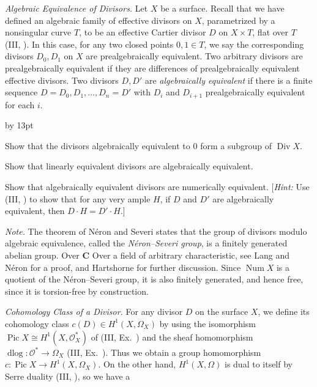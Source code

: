 {{\vspace{2pt}
\noindent\hypertarget{ex-V-1.7}{}\emph{Algebraic Equivalence of Divisors.} Let $X$ be a surface. Recall that we have defined an algebraic family of effective divisors on $X$, parametrized by a nonsingular curve $T$, to be an effective Cartier divisor $D$ on $X\times T$, flat over $T$ (III, ). In this case, for any two closed points $0,1\in T$, we say the corresponding divisors $D_0,D_1$ on $X$ are prealgebraically equivalent. Two arbitrary divisors are prealgebraically equivalent if they are differences of prealgebraically equivalent effective divisors. Two divisors $D,D'$ are \emph{algebraically equivalent} if there is a finite sequence $D=D_0,D_1,\ldots,D_n=D'$ with $D_i$ and $D_{i+1}$ prealgebraically equivalent for each $i$.
{\advance\leftskip by 13pt\par
\noindent\hypertarget{ex-V-1.7a}{}Show that the divisors algebraically equivalent to $0$ form a subgroup of $\operatorname{Div}X$.

\noindent\hypertarget{ex-V-1.7b}{}Show that linearly equivalent divisors are algebraically equivalent.

\noindent\hypertarget{ex-V-1.7c}{}Show that algebraically equivalent divisors are numerically equivalent. [\emph{Hint:} Use (III, ) to show that for any very ample $H$, if $D$ and $D'$ are algebraically equivalent, then $D\cdot H=D'\cdot H$.]\par}

\emph{Note.} The theorem of N\'eron and Severi states that the group of divisors modulo algebraic equivalence, called the \emph{N\'eron--Severi group}, is a finitely generated abelian group. Over $\mathbf C$
Over a field of arbitrary characteristic, see Lang and N\'eron  for a proof, and Hartshorne  for further discussion. Since $\operatorname{Num}X$ is a quotient of the N\'eron--Severi group, it is also finitely generated, and hence free, since it is torsion-free by construction.

\vspace{2pt}
\noindent\hypertarget{ex-V-1.8}{}\emph{Cohomology Class of a Divisor.} For any divisor $D$ on the surface $X$, we define its cohomology class $c(D)\in H^1(X,\Omega_X)$ by using the isomorphism $\operatorname{Pic}X\cong H^1(X,\mathcal O_X^*)$ of (III, Ex.~) and the sheaf homomorphism $\operatorname{dlog}\colon\mathcal O^*\to\Omega_X$ (III, Ex.~). Thus we obtain a group homomorphism $c\colon\operatorname{Pic}X\to H^1(X,\Omega_X)$. On the other hand, $H^1(X,\Omega)$ is dual to itself by Serre duality (III, ), so we have a\par}
}
